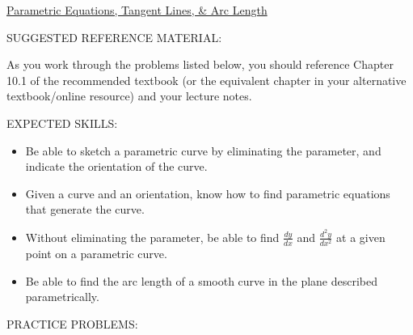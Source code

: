 \documentclass[12pt]{article}
\begin{document}
\begin{center}
\underline{\LARGE{Parametric Equations, Tangent Lines, \& Arc Length}}
\end{center}

\noindent SUGGESTED REFERENCE MATERIAL:

\bigskip

\noindent As you work through the problems listed below, you should reference Chapter 10.1 of the recommended textbook (or the equivalent chapter in your alternative textbook/online resource) and your lecture notes.

\bigskip

\noindent EXPECTED SKILLS:

\begin{itemize}

\item Be able to sketch a parametric curve by eliminating the parameter, and indicate the orientation of the curve. 

\item Given a curve and an orientation, know how to find parametric equations that generate the curve. 

\item Without eliminating the parameter, be able to find $\frac{dy}{dx}$ and $\frac{d^2y}{dx^2}$ at a given point on a parametric curve.

\item Be able to find the arc length of a smooth curve in the plane described parametrically.

\end{itemize}

\noindent PRACTICE PROBLEMS:

\medskip

\end{document}
